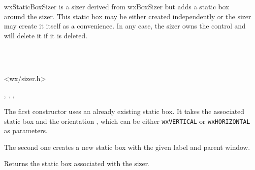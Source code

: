 \section{}\label{wxstaticboxsizer}

wxStaticBoxSizer is a sizer derived from wxBoxSizer but adds a static
box around the sizer. This static box may be either created independently or
the sizer may create it itself as a convenience. In any case, the sizer owns
the  control and will delete it if it is
deleted.


\\
\\


<wx/sizer.h>


, , , 



\label{wxstaticboxsizerwxstaticboxsizer}



The first constructor uses an already existing static box. It takes the
associated static box and the orientation , which can be either
\texttt{wxVERTICAL} or \texttt{wxHORIZONTAL} as parameters.

The second one creates a new static box with the given label and parent window.


\label{wxstaticboxsizergetstaticbox}


Returns the static box associated with the sizer.

